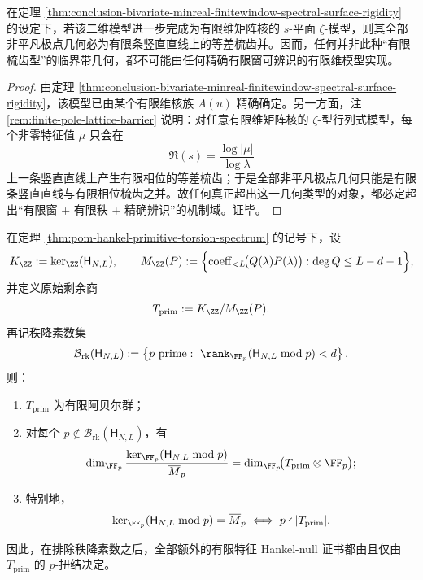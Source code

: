 \begin{corollary}[有限窗可辨识模型的有限梳齿刚性]\label{cor:conclusion-bivariate-finitewindow-finite-comb-rigidity}
在定理 \ref{thm:conclusion-bivariate-minreal-finitewindow-spectral-surface-rigidity} 的设定下，若该二维模型进一步完成为有限维矩阵核的 \(s\)-平面 \(\zeta\)-模型，则其全部非平凡极点几何必为有限条竖直直线上的等差梳齿并。因而，任何并非此种“有限梳齿型”的临界带几何，都不可能由任何精确有限窗可辨识的有限维模型实现。
\end{corollary}

\begin{proof}
由定理 \ref{thm:conclusion-bivariate-minreal-finitewindow-spectral-surface-rigidity}，该模型已由某个有限维核族 \(A(u)\) 精确确定。另一方面，注 \ref{rem:finite-pole-lattice-barrier} 说明：对任意有限维矩阵核的 \(\zeta\)-型行列式模型，每个非零特征值 \(\mu\) 只会在
\[
\Re(s)=\frac{\log|\mu|}{\log\lambda}
\]
上一条竖直直线上产生有限相位的等差梳齿；于是全部非平凡极点几何只能是有限条竖直直线与有限相位梳齿之并。故任何真正超出这一几何类型的对象，都必定超出“有限窗 + 有限秩 + 精确辨识”的机制域。证毕。
\end{proof}

\begin{theorem}[原始剩余扭结是秩降之外唯一的有限特征失真源]\label{thm:conclusion-hankel-primitive-torsion-only-finite-characteristic-distortion}
在定理 \ref{thm:pom-hankel-primitive-torsion-spectrum} 的记号下，设
\[
K_{\ZZ}:=\ker_{\ZZ}(\mathsf H_{N,L}),
\qquad
M_{\ZZ}(P):=
\Bigl\{
\operatorname{coeff}_{<L}\!\bigl(Q(\lambda)P(\lambda)\bigr):
\deg Q\le L-d-1
\Bigr\},
\]
并定义原始剩余商
\[
T_{\mathrm{prim}}:=K_{\ZZ}/M_{\ZZ}(P).
\]
再记秩降素数集
\[
\mathcal B_{\mathrm{rk}}(\mathsf H_{N,L})
:=
\left\{
p\ \text{prime}:\ \rank_{\FF_p}(\mathsf H_{N,L}\bmod p)<d
\right\}.
\]
则：
\begin{enumerate}
  \item \(T_{\mathrm{prim}}\) 为有限阿贝尔群；
  \item 对每个 \(p\notin \mathcal B_{\mathrm{rk}}(\mathsf H_{N,L})\)，有
  \[
  \dim_{\FF_p}
  \frac{\ker_{\FF_p}(\mathsf H_{N,L}\bmod p)}{\overline M_p}
  =
  \dim_{\FF_p}\!\bigl(T_{\mathrm{prim}}\otimes\FF_p\bigr);
  \]
  \item 特别地，
  \[
  \ker_{\FF_p}(\mathsf H_{N,L}\bmod p)=\overline M_p
  \iff
  p\nmid |T_{\mathrm{prim}}|.
  \]
\end{enumerate}
因此，在排除秩降素数之后，全部额外的有限特征 Hankel-null 证书都由且仅由 \(T_{\mathrm{prim}}\) 的 \(p\)-扭结决定。
\end{theorem}

